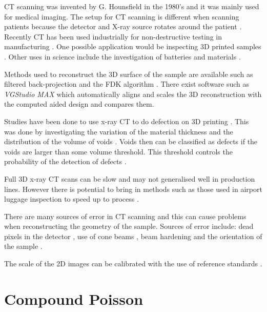 \documentclass[12pt, a4paper]{memoir}
\begin{document}
CT scanning was invented by G. Hounsfield \citep{hounsfield1980computed} in the 1980's and it was mainly used for medical imaging. The setup for CT scanning is different when scanning patients because the detector and X-ray source rotates around the patient \citep{cantatore2011introduction}. Recently CT has been used industrially for non-destructive testing in manufacturing \citep{cantatore2011introduction}. One possible application would be inspecting 3D printed samples \citep{villarraga2015assessing}. Other uses in science include the investigation of batteries \citep{o2017investigating} and materials \citep{wang2017x} \citep{zhang2016x}.

Methods used to reconstruct the 3D surface of the sample are available such as filtered back-projection \citep{brooks1976principles} and the FDK algorithm \citep{feldkamp1984practical}. There exist software such as \emph{VGStudio MAX} \citep{reinhart2008industrial} which automatically aligns and scales the 3D reconstruction with the computed aided design and compares them.

Studies have been done to use x-ray CT to do defection on 3D printing \citep{kim2016inspection} \citep{villarraga2015assessing}. This was done by investigating the variation of the material thickness and the distribution of the volume of voids \citep{villarraga2015assessing}. Voids then can be classified as defects if the voids are larger than some volume threshold. This threshold controls the probability of the detection of defects \citep{amrhein2014characterization} \citep{gandossi2010probability}.

Full 3D x-ray CT scans can be slow and may not generalised well in production lines. However there is potential to bring in methods such as those used in airport luggage inspection to speed up to process \citep{warnett2016towards}.

There are many sources of error in CT scanning \citep{cantatore2011introduction} and this can cause problems when reconstructing the geometry of the sample. Sources of error include: dead pixels in the detector \citep{brettschneider2014spatial}, use of cone beams \citep{sun2016applications}, beam hardening and the orientation of the sample \citep{corcoran2016observations}.

The scale of the 2D images can be calibrated with the use of reference standards \citep{bartscher2007enhancement} \citep{lifton2013application}.

\section{Compound Poisson}
\end{document}
